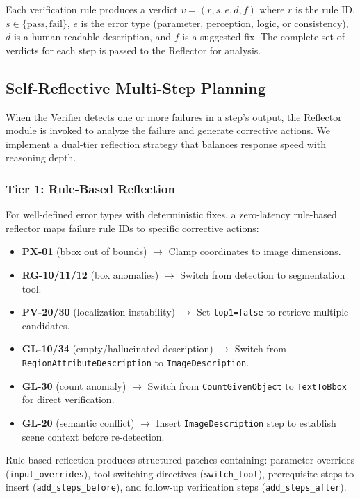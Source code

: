 \documentclass[journal]{IEEEtran}
\begin{document}
Each verification rule produces a verdict $v = (r, s, e, d, f)$ where $r$ is the rule ID, $s \in \{\text{pass}, \text{fail}\}$, $e$ is the error type (parameter, perception, logic, or consistency), $d$ is a human-readable description, and $f$ is a suggested fix.
The complete set of verdicts for each step is passed to the Reflector for analysis.


\subsection{Self-Reflective Multi-Step Planning}
\label{subsec:reflection}

When the Verifier detects one or more failures in a step's output, the Reflector module is invoked to analyze the failure and generate corrective actions.
We implement a dual-tier reflection strategy that balances response speed with reasoning depth.

\subsubsection{Tier 1: Rule-Based Reflection}
For well-defined error types with deterministic fixes, a zero-latency rule-based reflector maps failure rule IDs to specific corrective actions:

\begin{itemize}[leftmargin=*]
    \item \textbf{PX-01} (bbox out of bounds) $\rightarrow$ Clamp coordinates to image dimensions.
    \item \textbf{RG-10/11/12} (box anomalies) $\rightarrow$ Switch from detection to segmentation tool.
    \item \textbf{PV-20/30} (localization instability) $\rightarrow$ Set \texttt{top1=false} to retrieve multiple candidates.
    \item \textbf{GL-10/34} (empty/hallucinated description) $\rightarrow$ Switch from \texttt{RegionAttributeDescription} to \texttt{ImageDescription}.
    \item \textbf{GL-30} (count anomaly) $\rightarrow$ Switch from \texttt{CountGivenObject} to \texttt{TextToBbox} for direct verification.
    \item \textbf{GL-20} (semantic conflict) $\rightarrow$ Insert \texttt{ImageDescription} step to establish scene context before re-detection.
\end{itemize}

Rule-based reflection produces structured patches containing: parameter overrides (\texttt{input\_overrides}), tool switching directives (\texttt{switch\_tool}), prerequisite steps to insert (\texttt{add\_steps\_before}), and follow-up verification steps (\texttt{add\_steps\_after}).
\end{document}
